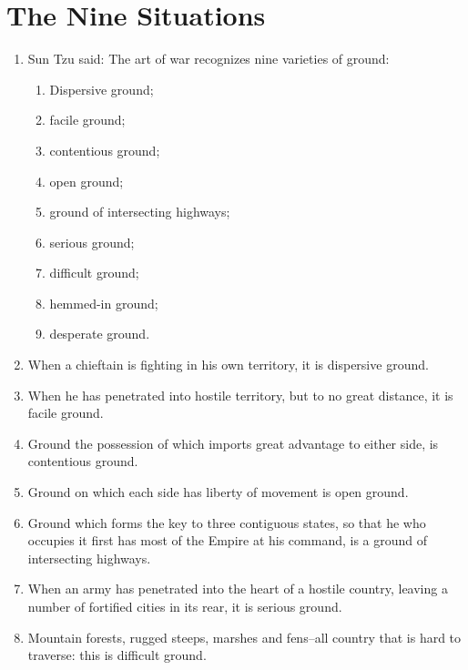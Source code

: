 \addtocounter{chapter}{1}\chapter*{The Nine Situations}
\begin{enumerate}
  
\item Sun Tzu said:  The art of war recognizes nine varieties of ground:
  \begin{enumerate}
  \item Dispersive ground; \item facile ground; \item contentious
    ground;
  \item open ground; \item ground of intersecting highways;
  \item serious ground; \item difficult ground; \item hemmed-in
    ground;
  \item desperate ground.
  \end{enumerate}


  \item When a chieftain is fighting in his own territory, it is
    dispersive ground.

  \item When he has penetrated into hostile territory, but to no great
    distance, it is facile ground.

  \item Ground the possession of which imports great advantage to
    either side, is contentious ground.

  \item Ground on which each side has liberty of movement is open
    ground.

  \item Ground which forms the key to three contiguous states, so that
    he who occupies it first has most of the Empire at his command, is
    a ground of intersecting highways.

  \item When an army has penetrated into the heart of a hostile
    country, leaving a number of fortified cities in its rear, it is
    serious ground.

  \item Mountain forests, rugged steeps, marshes and fens--all country
    that is hard to traverse: this is difficult ground.


\end{enumerate}

